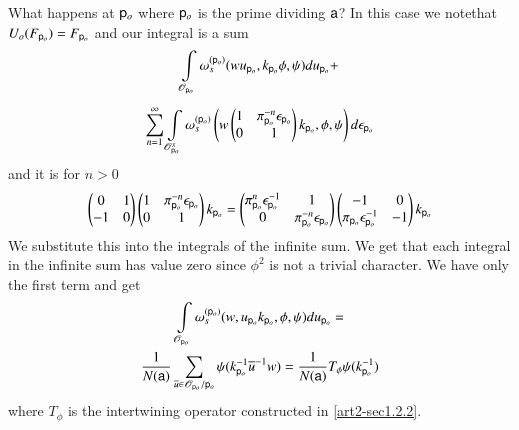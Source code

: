 What happens at $\mathsf{p}_{o}$ where $\mathsf{p}_{o}$ is the prime dividing $\mathsf{a}$? In this case we note\pageoriginale that $U_{o}(F_{\mathsf{p}_{o}})=F_{\mathsf{p}_{o}}$ and our integral is a sum
\begin{gather*}
\int\limits_{\mathscr{O}_{\mathsf{p}_{o}}}\omega_{s}^{(\mathsf{p}_{o})}(wu_{\mathsf{p}_{o}},k_{\mathsf{p}_{o}}\phi,\psi)du_{\mathsf{p}_{o}}+\\[4pt]
\sum\limits^{\infty}_{n=1}\int\limits_{\mathscr{O}^{x}_{\mathsf{p}_{o}}}\omega^{(\mathsf{p}_{o})}_{s}\left(w\left(\begin{matrix} 1 & \pi^{-n}_{\mathsf{p}_{o}}  \epsilon_{\mathsf{p}_{o}}\\
0 & 1
\end{matrix}\right)k_{\mathsf{p}_{o}},\phi,\psi\right)d\epsilon_{\mathsf{p}_{o}}
\end{gather*}
and it is for $n>0$
$$
\left(\begin{matrix}
0 & 1\\
-1 & 0
\end{matrix}\right)\left(
\begin{matrix}
1 & \pi^{-n}_{\mathsf{p}_{o}}\epsilon_{\mathsf{p}_{o}}\\
0 & 1
\end{matrix}
\right)k_{\mathsf{p}_{o}}
=\left(
\begin{matrix}
\pi^{n}_{\mathsf{p}_{o}}\epsilon^{-1}_{\mathsf{p}_{o}} & 1\\
0 & \pi^{-n}_{\mathsf{p}_{o}}\epsilon_{\mathsf{p}_{o}}
\end{matrix}
\right)
\left(
\begin{matrix}
-1 & 0\\
\pi_{\mathsf{p}_{o}}\epsilon^{-1}_{\mathsf{p}_{o}} & -1
\end{matrix}\right)k_{\mathsf{p}_{o}}
$$
We substitute this into the integrals of the infinite sum. We get that each integral in the infinite sum has value zero since $\phi^{2}$ is not a trivial character. We have only the first term and get
\begin{gather*}
\int\limits_{\mathscr{O}_{\mathsf{p}_{o}}}\omega_{s}^{(\mathsf{p}_{o})}(w,u_{\mathsf{p}_{o}}k_{\mathsf{p}_{o}},\phi,\psi)du_{\mathsf{p}_{o}}=\\
\frac{1}{N(\mathsf{a})}\sum\limits_{\overline{u}\in \mathscr{O}_{\mathsf{p}_{o}}/\mathsf{p}_{o}}\psi(k^{-1}_{\mathsf{p}_{o}}\overline{u}^{-1}w)=\frac{1}{N(\mathsf{a})}T_{\phi}\psi(k^{-1}_{\mathsf{p}_{o}})
\end{gather*}
where $T_{\phi}$ is the intertwining operator constructed in \ref{art2-sec1.2.2}.

